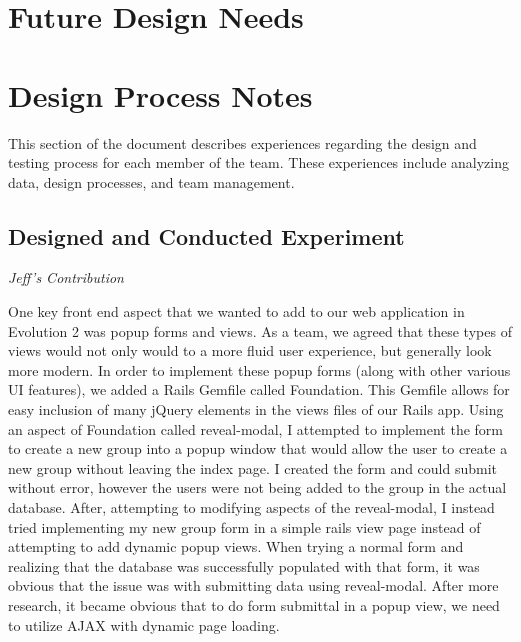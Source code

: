 \documentclass[11pt]{article}
\begin{document}
\section{Future Design Needs}

\section{Design Process Notes}

This section of the document describes experiences regarding the design and testing process for each member of the team.  These experiences include analyzing data, design processes, and team management.

\subsection{Designed and Conducted Experiment}

\textit{Jeff's Contribution}

One key front end aspect that we wanted to add to our web application in Evolution 2 was popup forms and views.  As a team, we agreed that these types of views would not only would to a more fluid user experience, but generally look more modern.  In order to implement these popup forms (along with other various UI features), we added a Rails Gemfile called Foundation.  This Gemfile allows for easy inclusion of many jQuery elements in the views files of our Rails app.  Using an aspect of Foundation called reveal-modal, I attempted to implement the form to create a new group into a popup window that would allow the user to create a new group without leaving the index page.  I created the form and could submit without error, however the users were not being added to the group in the actual database.  After, attempting to modifying aspects of the reveal-modal, I instead tried implementing my new group form in a simple rails view page instead of attempting to add dynamic popup views.  When trying a normal form and realizing that the database was successfully populated with that form, it was obvious that the issue was with submitting data using reveal-modal.  After more research, it became obvious that to do form submittal in a popup view, we need to utilize AJAX with dynamic page loading.
\end{document}
